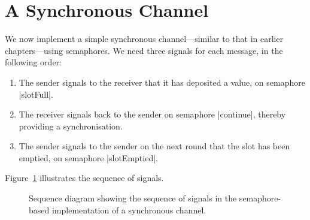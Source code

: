 \section{A Synchronous Channel}

We  now implement a simple synchronous channel---similar to that in
earlier chapters---using semaphores.  We  need three signals for each
message, in the following order:
%
\begin{enumerate}
\item The sender  signals to the receiver that it has deposited a value, on
  semaphore |slotFull|.

\item The receiver  signals back to the sender on semaphore |continue|,
  thereby providing a synchronisation.

\item The sender signals to the sender on the next round that the slot has
  been emptied, on semaphore |slotEmptied|.
\end{enumerate}
%
Figure~\ref{fig:semaphore-syncChan-SD} illustrates the sequence of signals. 


\begin{figure}[hbtp]
\begin{center}
\end{center}
\caption{Sequence diagram showing the sequence of signals in the
  semaphore-based implementation of a synchronous channel.}
\label{fig:semaphore-syncChan-SD} 
\end{figure}



